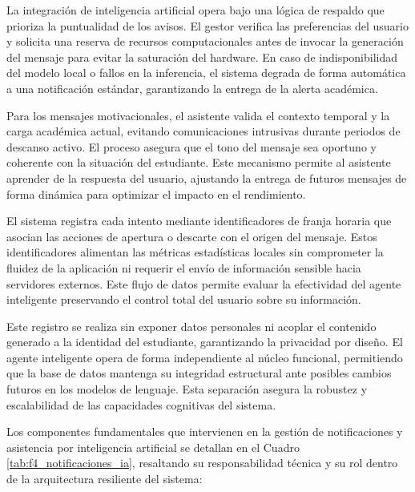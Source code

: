 La integración de inteligencia artificial opera bajo una lógica de respaldo que prioriza la puntualidad de los avisos. El gestor verifica las preferencias del usuario y solicita una reserva de recursos computacionales antes de invocar la generación del mensaje para evitar la saturación del hardware. En caso de indisponibilidad del modelo local o fallos en la inferencia, el sistema degrada de forma automática a una notificación estándar, garantizando la entrega de la alerta académica.

Para los mensajes motivacionales, el asistente valida el contexto temporal y la carga académica actual, evitando comunicaciones intrusivas durante periodos de descanso activo. El proceso asegura que el tono del mensaje sea oportuno y coherente con la situación del estudiante. Este mecanismo permite al asistente aprender de la respuesta del usuario, ajustando la entrega de futuros mensajes de forma dinámica para optimizar el impacto en el rendimiento.

El sistema registra cada intento mediante identificadores de franja horaria que asocian las acciones de apertura o descarte con el origen del mensaje. Estos identificadores alimentan las métricas estadísticas locales sin comprometer la fluidez de la aplicación ni requerir el envío de información sensible hacia servidores externos. Este flujo de datos permite evaluar la efectividad del agente inteligente preservando el control total del usuario sobre su información.

Este registro se realiza sin exponer datos personales ni acoplar el contenido generado a la identidad del estudiante, garantizando la privacidad por diseño. El agente inteligente opera de forma independiente al núcleo funcional, permitiendo que la base de datos mantenga su integridad estructural ante posibles cambios futuros en los modelos de lenguaje. Esta separación asegura la robustez y escalabilidad de las capacidades cognitivas del sistema.

Los componentes fundamentales que intervienen en la gestión de notificaciones y asistencia por inteligencia artificial se detallan en el Cuadro \ref{tab:f4_notificaciones_ia}, resaltando su responsabilidad técnica y su rol dentro de la arquitectura resiliente del sistema:

